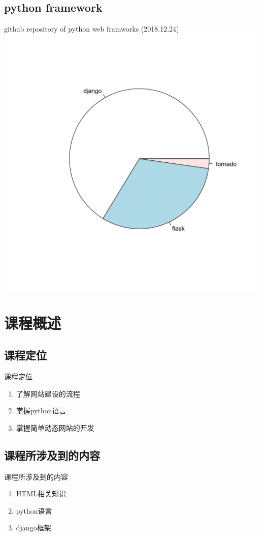 \documentclass{beamer}
\begin{document}
\subsection{python framework}
\begin{frame}{github repository of python web framworks (2018.12.24)}
\includegraphics[height=1\textheight]{django-introduce-1.pdf}
\end{frame}
\section{课程概述}
\subsection{课程定位}
\begin{frame}{课程定位}
\begin{enumerate}
\item 了解网站建设的流程
\item 掌握python语言
\item 掌握简单动态网站的开发
\end{enumerate}

\end{frame}
\subsection{课程所涉及到的内容}
\begin{frame}{课程所涉及到的内容}
\begin{enumerate}
\item HTML相关知识
\item python语言
\item django框架
\end{enumerate}

\end{frame}
\end{document}
